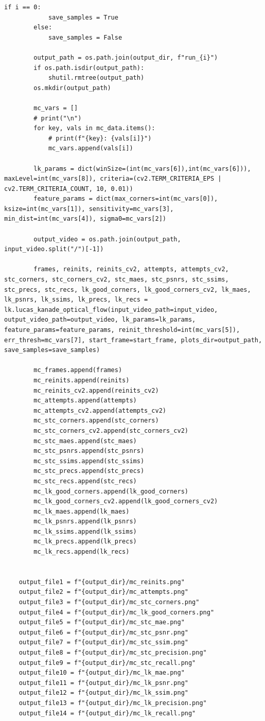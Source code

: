 \documentclass[11pt, conference, letterpaper]{IEEEtran}
\begin{document}
\begin{lstlisting}[style=python, caption={\texttt{monte\_carlo\_analysis.py}}, label={lst:mc}]
        if i == 0:
            save_samples = True
        else:
            save_samples = False
            
        output_path = os.path.join(output_dir, f"run_{i}")
        if os.path.isdir(output_path):
            shutil.rmtree(output_path)    
        os.mkdir(output_path)
        
        mc_vars = []
        # print("\n")
        for key, vals in mc_data.items():
            # print(f"{key}: {vals[i]}")
            mc_vars.append(vals[i])
        
        lk_params = dict(winSize=(int(mc_vars[6]),int(mc_vars[6])), maxLevel=int(mc_vars[8]), criteria=(cv2.TERM_CRITERIA_EPS | cv2.TERM_CRITERIA_COUNT, 10, 0.01))
        feature_params = dict(max_corners=int(mc_vars[0]), ksize=int(mc_vars[1]), sensitivity=mc_vars[3], min_dist=int(mc_vars[4]), sigma0=mc_vars[2])
        
        output_video = os.path.join(output_path, input_video.split("/")[-1])
    
        frames, reinits, reinits_cv2, attempts, attempts_cv2, stc_corners, stc_corners_cv2, stc_maes, stc_psnrs, stc_ssims, stc_precs, stc_recs, lk_good_corners, lk_good_corners_cv2, lk_maes, lk_psnrs, lk_ssims, lk_precs, lk_recs = lk.lucas_kanade_optical_flow(input_video_path=input_video, output_video_path=output_video, lk_params=lk_params, feature_params=feature_params, reinit_threshold=int(mc_vars[5]), err_thresh=mc_vars[7], start_frame=start_frame, plots_dir=output_path, save_samples=save_samples)
        
        mc_frames.append(frames)
        mc_reinits.append(reinits)
        mc_reinits_cv2.append(reinits_cv2)
        mc_attempts.append(attempts)
        mc_attempts_cv2.append(attempts_cv2)
        mc_stc_corners.append(stc_corners)
        mc_stc_corners_cv2.append(stc_corners_cv2)
        mc_stc_maes.append(stc_maes)
        mc_stc_psnrs.append(stc_psnrs)
        mc_stc_ssims.append(stc_ssims)
        mc_stc_precs.append(stc_precs)
        mc_stc_recs.append(stc_recs)
        mc_lk_good_corners.append(lk_good_corners)
        mc_lk_good_corners_cv2.append(lk_good_corners_cv2)
        mc_lk_maes.append(lk_maes)
        mc_lk_psnrs.append(lk_psnrs)
        mc_lk_ssims.append(lk_ssims)
        mc_lk_precs.append(lk_precs)
        mc_lk_recs.append(lk_recs)
        
    
    output_file1 = f"{output_dir}/mc_reinits.png"
    output_file2 = f"{output_dir}/mc_attempts.png"
    output_file3 = f"{output_dir}/mc_stc_corners.png"
    output_file4 = f"{output_dir}/mc_lk_good_corners.png"
    output_file5 = f"{output_dir}/mc_stc_mae.png"
    output_file6 = f"{output_dir}/mc_stc_psnr.png"
    output_file7 = f"{output_dir}/mc_stc_ssim.png"
    output_file8 = f"{output_dir}/mc_stc_precision.png"
    output_file9 = f"{output_dir}/mc_stc_recall.png"        
    output_file10 = f"{output_dir}/mc_lk_mae.png"
    output_file11 = f"{output_dir}/mc_lk_psnr.png"
    output_file12 = f"{output_dir}/mc_lk_ssim.png"
    output_file13 = f"{output_dir}/mc_lk_precision.png"
    output_file14 = f"{output_dir}/mc_lk_recall.png"
    

\end{lstlisting}
\end{document}
